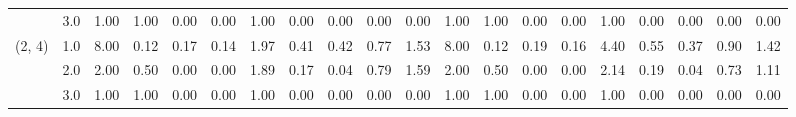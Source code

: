 \begin{tabular}{llrrrrrrrrrrrrrrrrrr}
       & 3.0 &               1.00 &                     1.00 &                                 0.00 &                             0.00 &                           1.00 &                                               0.00 &                                            0.00 &                                            0.00 &                                        0.00 &               1.00 &                     1.00 &                                 0.00 &                             0.00 &                           1.00 &                                               0.00 &                                            0.00 &                                            0.00 &                                        0.00 \\
(2, 4) & 1.0 &               8.00 &                     0.12 &                                 0.17 &                             0.14 &                           1.97 &                                               0.41 &                                            0.42 &                                            0.77 &                                        1.53 &               8.00 &                     0.12 &                                 0.19 &                             0.16 &                           4.40 &                                               0.55 &                                            0.37 &                                            0.90 &                                        1.42 \\
       & 2.0 &               2.00 &                     0.50 &                                 0.00 &                             0.00 &                           1.89 &                                               0.17 &                                            0.04 &                                            0.79 &                                        1.59 &               2.00 &                     0.50 &                                 0.00 &                             0.00 &                           2.14 &                                               0.19 &                                            0.04 &                                            0.73 &                                        1.11 \\
       & 3.0 &               1.00 &                     1.00 &                                 0.00 &                             0.00 &                           1.00 &                                               0.00 &                                            0.00 &                                            0.00 &                                        0.00 &               1.00 &                     1.00 &                                 0.00 &                             0.00 &                           1.00 &                                               0.00 &                                            0.00 &                                            0.00 &                                        0.00 \\

\end{tabular}
